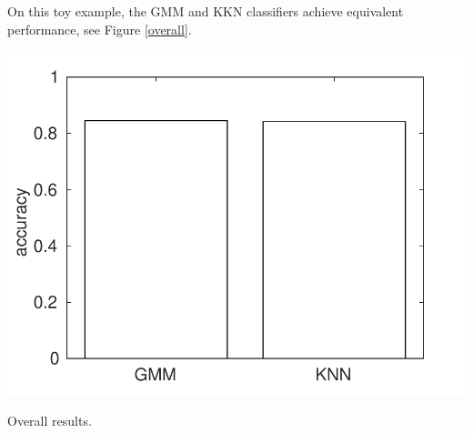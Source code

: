 \documentclass[12pt,a4paper,fleqn]{tufte-handout}
\begin{document}
On this toy example, the GMM  and KKN classifiers achieve equivalent performance, see Figure \ref{overall}.

\begin{marginfigure}
\includegraphics[width=\textwidth]{figures/overall}
\caption{Overall results.}
\label{overall}
\end{marginfigure}
  
  
\nocite{*}  
 
 
  
\end{document}
